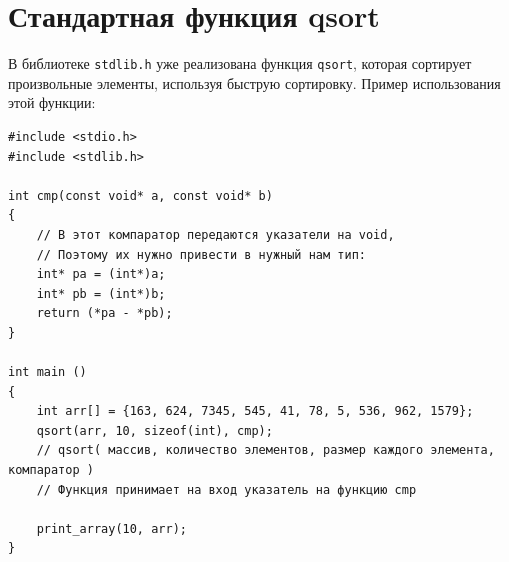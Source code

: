 \documentclass{article}
\begin{document}
\section*{Стандартная функция qsort}

В библиотеке \texttt{stdlib.h} уже реализована функция \texttt{qsort}, которая сортирует произвольные элементы, используя быструю сортировку. Пример использования этой функции:
\begin{lstlisting}
#include <stdio.h>
#include <stdlib.h>

int cmp(const void* a, const void* b)
{
    // В этот компаратор передаются указатели на void,
    // Поэтому их нужно привести в нужный нам тип:
    int* pa = (int*)a;
    int* pb = (int*)b;
    return (*pa - *pb);
}

int main ()
{
    int arr[] = {163, 624, 7345, 545, 41, 78, 5, 536, 962, 1579};
    qsort(arr, 10, sizeof(int), cmp);
    // qsort( массив, количество элементов, размер каждого элемента, компаратор )
    // Функция принимает на вход указатель на функцию cmp
   
    print_array(10, arr);
}
\end{lstlisting}
\end{document}
